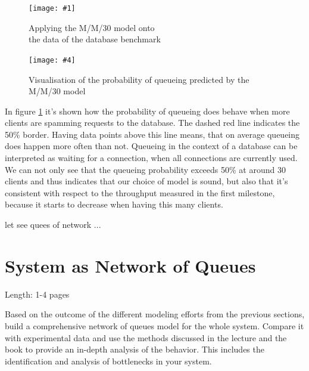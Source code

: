 \documentclass[11pt]{article}
\newcommand\TwoFig[6]{%
	\sbox\IBoxA{\texttt{[image: \#1]}}
	\sbox\IBoxB{\texttt{[image: \#4]}}%
	\ifdim\ht\IBoxA>\ht\IBoxB
	\setlength\IHeight{\ht\IBoxB}\else\setlength\IHeight{\ht\IBoxA}\fi%
	\begin{figure}[!htb]
		\minipage[t]{0.5\textwidth}\centering
		\texttt{[image: \#1]}
		\caption{#2}\label{#3}
		\endminipage \hfill
		\minipage[t]{0.5\textwidth}\centering
		\texttt{[image: \#4]}
		\caption{#5}\label{#6}
		\endminipage
	\end{figure}%
}
\begin{document}
\TwoFig {figures/database/mm30} {Applying the M/M/30 model onto\\ the data of the database benchmark} {fig:mm40}
		{figures/database/qprob} {Visualisation of the probability of queueing predicted by the M/M/30 model} {fig:qprob}
In figure \ref{fig:qprob} it's shown how the probability of queueing does behave when more clients are spamming requests to the database. The dashed red line indicates the 50\% border. Having data points above this line means, that on average queueing does happen more often than not. Queueing in the context of a database can be interpreted as waiting for a connection, when all connections are currently used. We can not only see that the queueing probability exceeds 50\% at around 30 clients and thus indicates that our choice of model is sound, but also that it's consistent with respect to the throughput measured in the first milestone, because it starts to decrease when having this many clients.

let see quees of network ...

\section{System as Network of Queues}\label{sec:network-of-queues}

Length: 1-4 pages

Based on the outcome of the different modeling efforts from the previous sections, build a comprehensive network of queues model for the whole system. Compare it with experimental data and use the methods discussed in the lecture and the book to provide an in-depth analysis of the behavior. This includes the identification and analysis of bottlenecks in your system.
\end{document}
